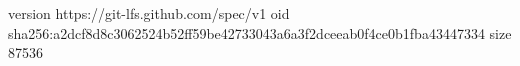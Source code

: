 version https://git-lfs.github.com/spec/v1
oid sha256:a2dcf8d8c3062524b52ff59be42733043a6a3f2dceeab0f4ce0b1fba43447334
size 87536
